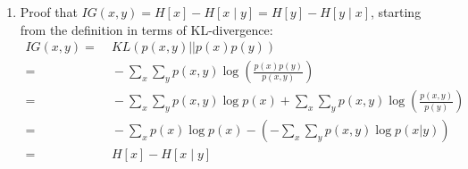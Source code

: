 \begin{enumerate}
\item Proof that $IG(x,y) = H[x] - H[x \mid y] = H[y] - H[y \mid x]$,
  starting from the definition in terms of KL-divergence:
  \begin{align*}
    IG(x,y)= & \; KL\left(p(x,y)||p(x)p(y)\right)\\
= & \;-\sum_{x}\sum_{y}p(x,y)\log(\frac{p(x)p(y)}{p(x,y)})\\
= & \;-\sum_{x}\sum_{y}p(x,y)\log p(x)+\sum_{x}\sum_{y}p(x,y)\log(\frac{p(x,y)}{p(y)})\\
= & \;-\sum_{x}p(x)\log p(x)-(-\sum_{x}\sum_{y}p(x,y)\log p(x|y))\\
= & \; H[x]-H[x\mid y]
    \end{align*}
\end{enumerate}

